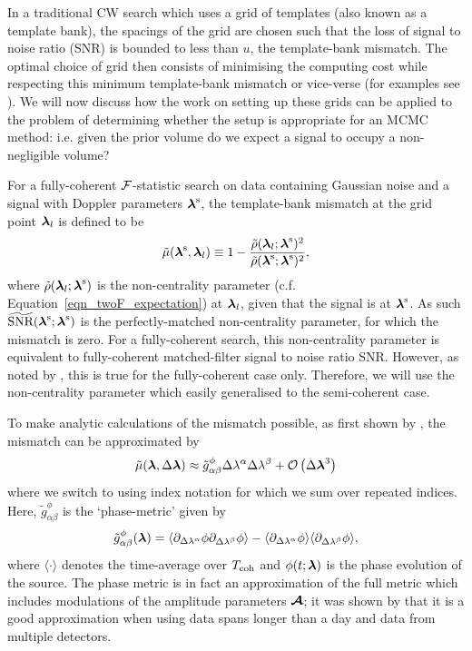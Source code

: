 \documentclass[aps, prd, twocolumn, superscriptaddress, floatfix, showpacs, nofootinbib, longbibliography]{revtex4-1}
\begin{document}
In a traditional CW search which uses a grid of templates (also known as a
template bank), the spacings of the grid are chosen such that the loss of
signal to noise ratio (SNR) is bounded to less than $u$, the template-bank
mismatch. The optimal choice of grid then consists of minimising the computing
cost while respecting this minimum template-bank mismatch or vice-verse (for
examples see \citet{pletsch2010, prix2012, wette2013, wette2015}). We will now
discuss how the work on setting up these grids can be applied to the problem of
determining whether the setup is appropriate for an MCMC method: i.e. given the
prior volume do we expect a signal to occupy a non-negligible volume?

For a fully-coherent ${\mathcal{F}}$-statistic search on data containing Gaussian noise
and a signal with Doppler parameters $\boldsymbol{\mathbf{\lambda}}^{\rm s}$, the template-bank
mismatch at the grid point $\boldsymbol{\mathbf{\lambda}}_{l}$ is defined to be
\begin{align}
\tilde{\mu}(\boldsymbol{\mathbf{\lambda}}^{\rm s}, \boldsymbol{\mathbf{\lambda}}_{l}) \equiv 1 - 
\frac{\tilde{\rho}(\boldsymbol{\mathbf{\lambda}}_l;\boldsymbol{\mathbf{\lambda}}^{\rm s})^{2}}
{\tilde{\rho}(\boldsymbol{\mathbf{\lambda}}^{\rm s}; \boldsymbol{\mathbf{\lambda}}^{\rm s})^{2}},
\end{align}
where $\tilde{\rho}(\boldsymbol{\mathbf{\lambda}}_l; \boldsymbol{\mathbf{\lambda}}^{\rm s})$ is the non-centrality
parameter (c.f. Equation~\ref{eqn_twoF_expectation}) at $\boldsymbol{\mathbf{\lambda}}_l$, given
that the signal is at $\boldsymbol{\mathbf{\lambda}}^{\rm s}$. As such
$\widetilde{\textrm{SNR}}(\boldsymbol{\mathbf{\lambda}}^{\rm s}; \boldsymbol{\mathbf{\lambda}}^{\rm s})$ is the
perfectly-matched non-centrality parameter, for which the mismatch is zero.
For a fully-coherent search, this non-centrality parameter is equivalent to
fully-coherent matched-filter signal to noise ratio SNR. However,
as noted by \citet{leaci2015}, this is true for the fully-coherent case only.
Therefore, we will use the non-centrality parameter which easily generalised to
the semi-coherent case.

To make analytic calculations of the mismatch possible, as first shown by
\citet{brady1998}, the mismatch can be approximated by
\begin{equation}
\tilde{\mu}(\boldsymbol{\mathbf{\lambda}}, \Delta\boldsymbol{\mathbf{\lambda}}) \approx 
\tilde{g}_{\alpha \beta}^{\phi} \Delta\lambda^{\alpha}\Delta\lambda^{\beta}
+ \mathcal{O}\left(\Delta\boldsymbol{\mathbf{\lambda}}^{3}\right)
\end{equation}
where we switch to using index notation for which we sum over repeated indices.
Here, $\tilde{g}_{\alpha\beta}^{\phi}$ is the `phase-metric' given by
\begin{align}
\tilde{g}^{\phi}_{\alpha \beta}(\boldsymbol{\mathbf{\lambda}}) = 
\langle 
\partial_{\Delta\lambda^{\alpha}}\phi
\partial_{\Delta\lambda^{\beta}}\phi
\rangle
-
\langle 
\partial_{\Delta\lambda^{\alpha}}\phi
\rangle
\langle
\partial_{\Delta\lambda^{\beta}}\phi
\rangle,
\label{eqn_metric}
\end{align}
where $\langle \cdot \rangle$ denotes the time-average over $T_{\rm coh}$ and
$\phi(t; \boldsymbol{\mathbf{\lambda}})$ is the phase evolution of the source. The phase metric is
in fact an approximation of the full metric which includes modulations of the
amplitude parameters $\boldsymbol{\mathcal{A}}$; it was shown by \citet{prix2007metric} that it is a
good approximation when using data spans longer than a day and data from
multiple detectors. 
\end{document}
